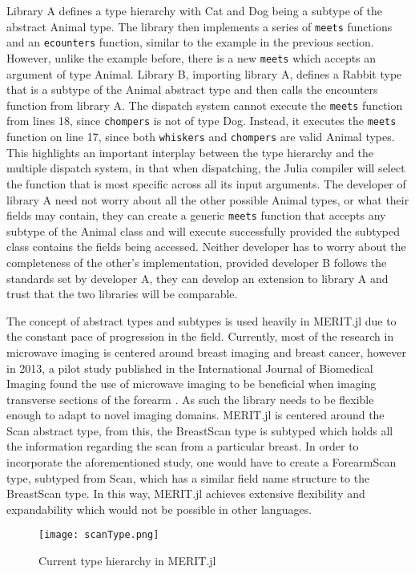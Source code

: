 Library A defines a type hierarchy with Cat and Dog being a subtype of the abstract Animal type. The library then
implements a series of \lstinline[language=Julia]{meets} functions and an \lstinline[language=Julia]{ecounters}
function, similar to the example in the previous section. However, unlike the example before, there is a new
\lstinline[language=Julia]{meets} which accepts an argument of type Animal. Library B, importing library A, defines a
Rabbit type that is a subtype of the Animal abstract type and then calls the encounters function from library A. The
dispatch system cannot execute the \lstinline[language=Julia]{meets} function from lines 18, since
\lstinline[language=Julia]{chompers} is not of type Dog. Instead, it executes the \lstinline[language=Julia]{meets}
function on line 17, since both \lstinline[language=Julia]{whiskers} and \lstinline[language=Julia]{chompers} are valid
Animal types. This highlights an important interplay between the type hierarchy and the multiple dispatch system, in
that when dispatching, the Julia compiler will select the function that is most specific across all its input arguments.
The developer of library A need not worry about all the other possible Animal types, or what their fields may contain,
they can create a generic \lstinline[language=Julia]{meets} function that accepts any subtype of the Animal class and
will execute successfully provided the subtyped class contains the fields being accessed. Neither developer has to worry
about the completeness of the other's implementation, provided developer B follows the standards set by developer A,
they can develop an extension to library A and trust that the two libraries will be comparable.

The concept of abstract types and subtypes is used heavily in MERIT.jl due to the constant pace of progression in the
field. Currently, most of the research in microwave imaging is centered around breast imaging and breast cancer, however
in 2013, a pilot study published in the International Journal of Biomedical Imaging found the use of microwave imaging
to be beneficial when imaging transverse sections of the forearm \cite{gilmoreMicrowaveImagingHuman2013}. As such the
library needs to be flexible enough to adapt to novel imaging domains. MERIT.jl is centered around the Scan abstract
type, from this, the BreastScan type is subtyped which holds all the information regarding the scan from a particular
breast. In order to incorporate the aforementioned study, one would have to create a ForearmScan type, subtyped from
Scan, which has a similar field name structure to the BreastScan type. In this way, MERIT.jl achieves extensive
flexibility and expandability which would not be possible in other languages. 
\begin{figure}[h!]
    \texttt{[image: scanType.png]}
    \centering
    \caption{Current type hierarchy in MERIT.jl} 
    \label{fig:scanType}
\end{figure}

